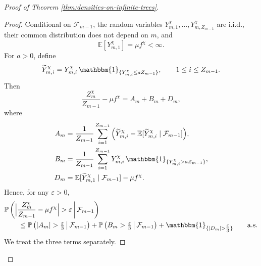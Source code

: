 \documentclass[11pt]{article}
\numberwithin{equation}{section}
\theoremstyle{plain}
\newcommand{\EE}{\mathbb E}
\newcommand{\PP}{\mathbb{P}}
\begin{document}
\begin{proof}[Proof of Theorem \ref{thm:densities-on-infinite-trees}]
\begin{proof}
Conditional on $\mathcal{F}_{m-1}$, the random variables $Y_{m,1}^{\chi},\ldots,Y_{m,Z_{m-1}}^{\chi}$ are i.i.d., their common distribution does not depend on $m$, and 
\[
\EE[Y_{m,1}^{\chi}]=\mu f^{\chi} < \infty .
\]
For $a>0$, define
\[
\widetilde{Y}_{m,i}^{\chi} = Y_{m,i}^{\chi}\, \mathbbm{1}_{\{Y_{m,i}^{\chi}\leq a Z_{m-1}\}}, \qquad 1\leq i\leq Z_{m-1}.
\]
Then
\[
\frac{Z_m^{\chi}}{Z_{m-1}}-\mu f^{\chi} = A_m + B_m + D_m,
\]
where
\[
\begin{aligned}
A_m &= \frac1{Z_{m-1}} \sum_{i=1}^{Z_{m-1}} \Big( \widetilde{Y}_{m,i}^{\chi} - \EE[\widetilde{Y}_{m,i}^{\chi}\mid\mathcal{F}_{m-1}] \Big),\\
B_m &= \frac{1}{Z_{m-1}} \sum_{i=1}^{Z_{m-1}} Y_{m,i}^{\chi}\, \mathbbm{1}_{\{Y_{m,i}^{\chi}>aZ_{m-1}\}},\\
D_m &= \EE[\widetilde{Y}_{m,1}^{\chi}\mid\mathcal{F}_{m-1}] -\mu f^{\chi}.
\end{aligned}
\]
Hence, for any $\varepsilon > 0$,
\[
\begin{aligned}
&\PP\left( \Big| \frac{Z_m^\chi}{Z_{m-1}}-\mu f^\chi \Big| >\varepsilon \,\middle|\, \mathcal{F}_{m-1} \right)\\
&\qquad \leq \PP\left( |A_m|>\tfrac{\varepsilon}{3} \,\middle|\, \mathcal{F}_{m-1} \right) 
+ \PP\left( B_m >\tfrac{\varepsilon}{3} \,\middle|\, \mathcal{F}_{m-1} \right) 
+ \mathbbm{1}_{\{|D_m|>\tfrac{\varepsilon}{3}\}} \qquad \mathrm{a.s.}
\end{aligned}
\]
We treat the three terms separately.


\end{proof}
\end{proof}
\end{document}
